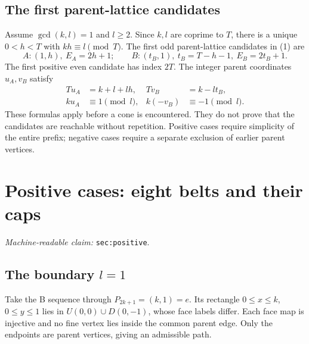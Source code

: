 \documentclass[11pt]{amsart}
\newcommand{\record}[1]{\nolinkurl{#1}}
\newcommand{\claimid}[1]{\par\nopagebreak\noindent\textit{Machine-readable claim:} \record{#1}.\par}
\begin{document}
\subsection{The first parent-lattice candidates}
Assume $\gcd(k,l)=1$ and $l\ge2$. Since $k,l$ are coprime to $T$,
there is a unique $0<h<T$ with $kh\equiv l\pmod T$. The first odd
parent-lattice candidates in (1) are
\begin{equation}\label{eq:4}
 A:(1,h),\ E_A=2h+1;\qquad
 B:(t_B,1),\ t_B=T-h-1,\ E_B=2t_B+1.\tag{4}
\end{equation}
The first positive even candidate has index $2T$. The integer parent
coordinates $u_A,v_B$ satisfy
\begin{equation}\label{eq:5}
\begin{aligned}
 Tu_A&=k+l+lh,& Tv_B&=k-lt_B,\\
 ku_A&\equiv1\pmod l,& k(-v_B)&\equiv-1\pmod l.
\end{aligned}\tag{5}
\end{equation}
These formulas apply before a cone is encountered. They do not prove
that the candidates are reachable without repetition. Positive cases
require simplicity of the entire prefix; negative cases require a
separate exclusion of earlier parent vertices.

\section{Positive cases: eight belts and their caps}\label{sec:positive}
\claimid{sec:positive}
\subsection{The boundary \texorpdfstring{$l=1$}{l=1}}
Take the B sequence through $P_{2k+1}=(k,1)=e$. Its rectangle
$0\le x\le k$, $0\le y\le1$ lies in $U(0,0)\cup D(0,-1)$,
whose face labels differ. Each face map is injective and no fine vertex
lies inside the common parent edge. Only the endpoints are parent
vertices, giving an admissible path.
\end{document}
